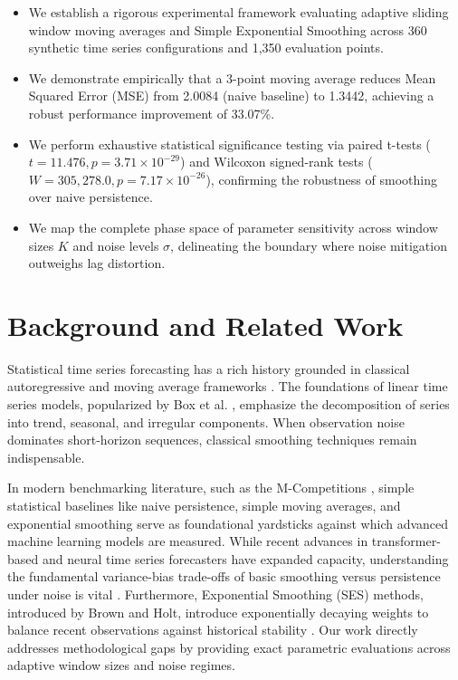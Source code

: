 \documentclass[11pt,letterpaper]{article}
\begin{document}
\begin{itemize}
  \item We establish a rigorous experimental framework evaluating adaptive sliding window moving averages and Simple Exponential Smoothing across 360 synthetic time series configurations and 1,350 evaluation points.
  \item We demonstrate empirically that a 3-point moving average reduces Mean Squared Error (MSE) from 2.0084 (naive baseline) to 1.3442, achieving a robust performance improvement of 33.07\%.
  \item We perform exhaustive statistical significance testing via paired t-tests ($t = 11.476, p = 3.71 \times 10^{-29}$) and Wilcoxon signed-rank tests ($W = 305,278.0, p = 7.17 \times 10^{-26}$), confirming the robustness of smoothing over naive persistence.
  \item We map the complete phase space of parameter sensitivity across window sizes $K$ and noise levels $\sigma$, delineating the boundary where noise mitigation outweighs lag distortion.
\end{itemize}

\section{Background and Related Work}

Statistical time series forecasting has a rich history grounded in classical autoregressive and moving average frameworks \citep{Box2015}. The foundations of linear time series models, popularized by Box et al. \citep{Box2015}, emphasize the decomposition of series into trend, seasonal, and irregular components. When observation noise dominates short-horizon sequences, classical smoothing techniques remain indispensable.

In modern benchmarking literature, such as the M-Competitions \citep{Makridakis2020}, simple statistical baselines like naive persistence, simple moving averages, and exponential smoothing serve as foundational yardsticks against which advanced machine learning models are measured. While recent advances in transformer-based and neural time series forecasters have expanded capacity, understanding the fundamental variance-bias trade-offs of basic smoothing versus persistence under noise is vital \citep{Hyndman2018}. Furthermore, Exponential Smoothing (SES) methods, introduced by Brown and Holt, introduce exponentially decaying weights to balance recent observations against historical stability \citep{Chatfield2000}. Our work directly addresses methodological gaps by providing exact parametric evaluations across adaptive window sizes and noise regimes.
\end{document}
